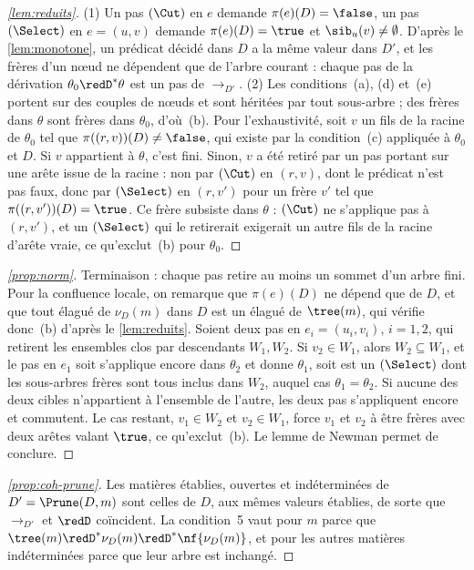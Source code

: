 \begin{proof}[\autoref{lem:reduits}]
(1) Un pas \((\Cut)\) en \(e\) demande \(\pi(e)(D)=\false\), un pas
\((\Select)\) en \(e=(u,v)\) demande \(\pi(e)(D)=\true\) et
\(\sib_u(v)\neq\emptyset\). D'après le \autoref{lem:monotone}, un prédicat
décidé dans \(D\) a la même valeur dans \(D'\), et les frères d'un nœud ne
dépendent que de l'arbre courant : chaque pas de la dérivation
\(\theta_0\redD^{*}\theta\) est un pas de \(\to_{D'}\).
(2) Les conditions~(a), (d) et~(e) portent sur des couples de nœuds et sont
héritées par tout sous-arbre ; des frères dans \(\theta\) sont frères dans
\(\theta_0\), d'où~(b). Pour l'exhaustivité, soit \(v\) un fils de la racine
de \(\theta_0\) tel que \(\pi((r,v))(D)\neq\false\), qui existe par la
condition~(c) appliquée à \(\theta_0\) et \(D\). Si \(v\) appartient à
\(\theta\), c'est fini. Sinon, \(v\) a été retiré par un pas portant sur une
arête issue de la racine : non par \((\Cut)\) en \((r,v)\), dont le prédicat
n'est pas faux, donc par \((\Select)\) en \((r,v')\) pour un frère \(v'\) tel
que \(\pi((r,v'))(D)=\true\). Ce frère subsiste dans \(\theta\) : \((\Cut)\)
ne s'applique pas à \((r,v')\), et un \((\Select)\) qui le retirerait
exigerait un autre fils de la racine d'arête vraie, ce qu'exclut~(b) pour
\(\theta_0\).
\end{proof}

\begin{proof}[\autoref{prop:norm}]
Terminaison : chaque pas retire au moins un sommet d'un arbre fini. Pour la
confluence locale, on remarque que \(\pi(e)(D)\) ne dépend que de \(D\), et
que tout élagué de \(\nu_D(m)\) dans \(D\) est un élagué de \(\tree(m)\),
qui vérifie donc~(b) d'après le \autoref{lem:reduits}. Soient deux pas en
\(e_i=(u_i,v_i)\), \(i=1,2\), qui retirent les ensembles clos par descendants
\(W_1,W_2\). Si \(v_2\in W_1\), alors \(W_2\subseteq W_1\), et le pas en
\(e_1\) soit s'applique encore dans \(\theta_2\) et donne \(\theta_1\), soit
est un \((\Select)\) dont les sous-arbres frères sont tous inclus dans
\(W_2\), auquel cas \(\theta_1=\theta_2\). Si aucune des deux cibles
n'appartient à l'ensemble de l'autre, les deux pas s'appliquent encore et
commutent. Le cas restant, \(v_1\in W_2\) et \(v_2\in W_1\), force \(v_1\) et
\(v_2\) à être frères avec deux arêtes valant \(\true\), ce qu'exclut~(b). Le
lemme de Newman permet de conclure.
\end{proof}

\begin{proof}[\autoref{prop:coh-prune}]
Les matières établies, ouvertes et indéterminées de \(D'=\Prune(D,m)\) sont
celles de \(D\), aux mêmes valeurs établies, de sorte que \(\to_{D'}\) et
\(\redD\) coïncident. La condition~5 vaut pour \(m\) parce que
\(\tree(m)\redD^{*}\nu_D(m)\redD^{*}\nf{\nu_D(m)}\), et pour les autres
matières indéterminées parce que leur arbre est inchangé.
\end{proof}

